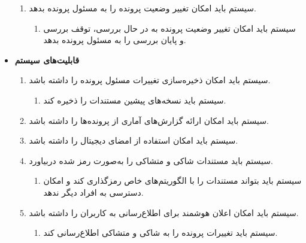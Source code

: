 \documentclass[12pt,a4paper,oneside]{article}
\begin{document}
\begin{itemize}
\begin{enumerate}
        \item 
        سیستم باید امکان تغییر وضعیت پرونده را به مسئول پرونده بدهد.
        \begin{enumerate}
            \renewcommand{\labelenumii}{\textbf{.R\arabic{enumi}.\arabic{enumii}}}
            \item 
            سیستم باید امکان تغییر وضعیت پرونده به در حال بررسی، توقف بررسی و پایان بررسی را به مسئول پرونده بدهد.
        \end{enumerate}
    \end{enumerate}

    \item
    \textbf{قابلیت‌های سیستم}
    \begin{enumerate}
        \renewcommand{\labelenumi}{\textbf{.R\arabic{enumi}}}
        \setcounter{enumi}{34}

        \item 
        سیستم باید امکان ذخیره‌سازی تغییرات مسئول پرونده را داشته باشد.
        \begin{enumerate}
            \renewcommand{\labelenumii}{\textbf{.R\arabic{enumi}.\arabic{enumii}}}
            \item 
            سیستم باید نسخه‌های پیشین مستندات را ذخیره کند.
        \end{enumerate}

        \item 
        سیستم باید امکان ارائه گزارش‌های آماری از پرونده‌ها را داشته باشد.

        \item 
        سیستم باید امکان استفاده از امضای دیجیتال را داشته باشد.

        \item 
        سیستم باید مستندات شاکی و متشاکی را به‌صورت رمز شده دربیاورد.
        \begin{enumerate}
            \renewcommand{\labelenumii}{\textbf{.R\arabic{enumi}.\arabic{enumii}}}
            \item 
            سیستم باید بتواند مستندات را با الگوریتم‌های خاص رمزگذاری کند و امکان دسترسی به افراد دیگر ندهد.
        \end{enumerate}

        \item 
        سیستم باید امکان اعلان هوشمند برای اطلاع‌رسانی به کاربران را داشته باشد.
        \begin{enumerate}
            \renewcommand{\labelenumii}{\textbf{.R\arabic{enumi}.\arabic{enumii}}}
            \item 
            سیستم باید تغییرات پرونده را به شاکی و متشاکی اطلاع‌رسانی کند.
        \end{enumerate}


\end{enumerate}
\end{itemize}
\end{document}
